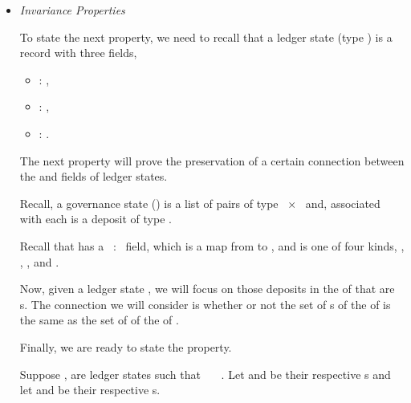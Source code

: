 \begin{itemize}
\item \textit{Invariance Properties}

        To state the next property, we need to recall that a ledger state (type \LState{}) is
        a record with three fields,
        \begin{itemize}
          \item[]  : \UTxOState{},
          \item[]  : \GovState{},
          \item[]  : \CertState{}.
        \end{itemize}
        The next property will prove the preservation of a certain connection between
        the  and  fields of ledger states.

        Recall, a governance state (\GovState{}) is a list of pairs of type
        \GovActionID{}~×~\GovActionState{} and, associated with each
        \GovActionID{} is a deposit of type \GovActionDeposit{}.

        Recall that \UTxOState{} has a ~:~\Deposits{} field, which is a map
        from \DepositPurpose{} to \Coin{}, and \DepositPurpose{} is one of four kinds,
        \CredentialDeposit{}, \PoolDeposit{}, \DRepDeposit{}, and \GovActionDeposit{}.

        Now, given a ledger state , we will focus on those deposits in the
        \UTxOState{} of  that are \GovActionDeposit{}s.  The connection we will
        consider is whether or not the set of \GovActionDeposit{}s of the
        \UTxOState{} of  is the same as the set of \GovActionDeposit{} of the \GovState{}
        of .

        Finally, we are ready to state the property.

  \begin{property}

  \vspace{-4mm}

  Suppose ,  are ledger states such that
   ~~~. Let 
  and  be their respective \UTxOState{}s and let 
  and  be their respective \GovState{}s.


\end{property}
\end{itemize}
